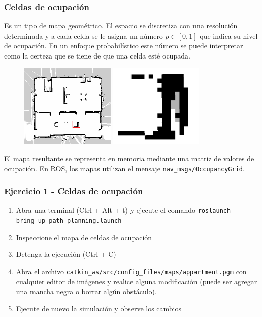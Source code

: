 \begin{frame}\frametitle{Celdas de ocupación}
  Es un tipo de mapa geométrico. El espacio se discretiza con una resolución determinada y a cada celda se le asigna un número $p\in[0,1]$ que indica su nivel de ocupación. En un enfoque probabilístico este número se puede interpretar como la certeza que se tiene de que una celda esté ocupada.
  \begin{figure}
    \centering
    \includegraphics[width=0.4\textwidth]{Figures/OccupancyGrid.png}
    \includegraphics[width=0.4\textwidth]{Figures/UniversumZoom.png}
    \end{figure}
  El mapa resultante se representa en memoria mediante una matriz de valores de ocupación. En ROS, los mapas utilizan el mensaje \texttt{nav\_msgs/OccupancyGrid}.
\end{frame}

\begin{frame}[containsverbatim]\frametitle{Ejercicio 1 - Celdas de ocupación}
  \begin{enumerate}
  \item Abra una terminal (Ctrl + Alt + t) y ejecute el comando \texttt{roslaunch bring\_up path\_planning.launch}
  \item Inspeccione el mapa de celdas de ocupación
  \item Detenga la ejecución (Ctrl + C)
  \item Abra el archivo \texttt{catkin\_ws/src/config\_files/maps/appartment.pgm} con cualquier editor de imágenes y realice alguna modificación (puede ser agregar una mancha negra o borrar algún obstáculo).
  \item Ejecute de nuevo la simulación y observe los cambios
  \end{enumerate}
\end{frame}

